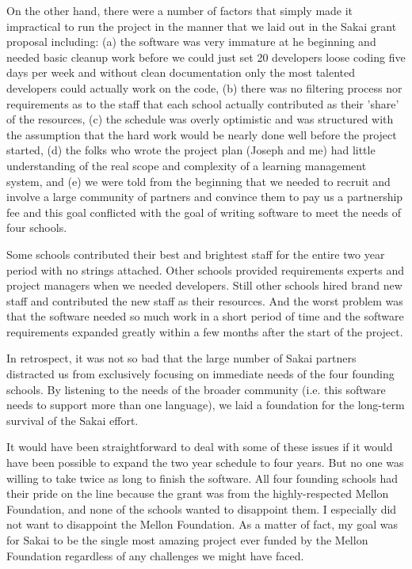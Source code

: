 \documentclass[12pt]{book}
\begin{document}
On the other hand, there were a number of factors that simply made
it impractical to run the project in the manner that we laid out
in the Sakai grant proposal including: (a) the software was very
immature at he beginning and needed basic cleanup work
before we could just set 20 developers loose coding five days
per week and without clean documentation only the most talented
developers could actually work on the code,
(b) there was no filtering process nor requirements
as to the staff that each school actually contributed as their
'share' of the resources,
(c) the schedule was overly optimistic and was structured with
the assumption that the hard work would be nearly done well before
the project started,
(d) the folks who wrote the project plan
(Joseph and me) had little understanding of the real scope and
complexity of a learning management system, and
(e) we were told
from the beginning that we needed to recruit and involve a large
community of partners and convince them to pay us a
partnership fee and this goal conflicted with the goal of writing
software to meet the needs of four schools.

Some schools contributed their best and brightest staff for the
entire two year period with no strings attached.  Other schools
provided requirements experts and project managers when we needed
developers.   Still other schools hired brand new staff and
contributed the new staff as their resources.  And the worst
problem was that the software needed so much work in a short period
of time and the software requirements expanded greatly within a few
months after the start of the project.

In retrospect, it was not so bad that the large number of Sakai
partners distracted us from exclusively focusing on immediate
needs of the four founding schools.   By listening to the needs of
the broader community (i.e. this software needs to support more
than one language), we laid a foundation for the long-term
survival of the Sakai effort.

It would have been straightforward to deal with some of these issues
if it would have been possible to expand the two year schedule to four
years.  But no one was willing to take twice as long to finish the
software.   All four founding schools had their pride on
the line because the grant was from the highly-respected Mellon
Foundation, and none of the schools wanted to disappoint them.
I especially did not want to disappoint the Mellon Foundation.
As a matter of fact, my goal was for Sakai to be the single most
amazing project ever funded by the Mellon Foundation regardless of
any challenges we might have faced.
\end{document}
